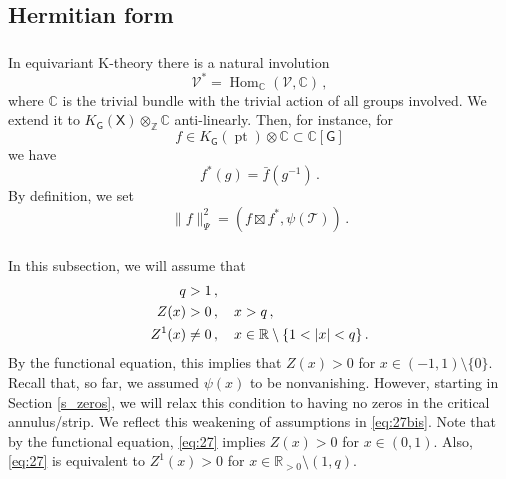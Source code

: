 \documentclass[14pt]{extarticle}
\newcommand{\C}{\mathbb{C}}
\newcommand{\Z}{\mathbb{Z}}
\newcommand{\R}{\mathbb{R}}
\newcommand{\bG}{\mathsf{G}}
\newcommand{\bX}{\mathsf{X}}
\newcommand{\cT}{\mathscr{T}}
\newcommand{\cV}{\mathscr{V}}
\DeclareMathOperator{\Hom}{Hom}
\DeclareMathOperator{\pt}{pt}
\theoremstyle{definition}
\begin{document}
\subsection{Hermitian form}

\subsubsection{}
 In equivariant K-theory there is a natural involution 
 \[
   \cV^* = \Hom_\C(\cV,\C)\,, 
 \]
 where $\C$ is the trivial bundle with the trivial action of all
 groups involved.
We extend it to $K_\bG(\bX) \otimes_\Z \C$ anti-linearly. 
Then, for instance, for
\[
  f \in K_\bG(\pt) \otimes \C \subset \C[\bG]
 \]
 we have
 \[
   f^*(g) = \bar{f}(g^{-1}) \,. 
 \]
 By definition, we set
 \begin{equation}
   \label{eq:20}
  \|f\|^2_\Psi = (f \boxtimes f^*, \psi(\cT)) \,. 
 \end{equation}

 \subsubsection{}


 
 In this subsection, we will assume that 
 \begin{align}
   q &>1 \,, \notag \\
   Z(x)&> 0\,, \quad x>q \,,  \label{eq:27} \\
   Z^1(x)&\ne 0\,,\quad  x \in \R \setminus \{1 < |x| < q\} \label{eq:27bis}
         \,. 
 \end{align}
 By the functional equation, this implies that $Z(x)>0$
 for $x \in (-1,1) \setminus \{0\}$. 
 Recall that, so far, we assumed $\psi(x)$ to be nonvanishing. However,
 starting in Section \ref{s_zeros}, we will relax this condition to
 having no zeros in the critical annulus/strip. We reflect this
 weakening of assumptions in \eqref{eq:27bis}. Note that by the functional
 equation, \eqref{eq:27} implies $Z(x)>0$ for $x\in (0,1)$. Also,
 \eqref{eq:27}
 is equivalent to 
 $Z^1(x)> 0$ for $x\in \R_{>0} \setminus (1,q)$. 

 
\end{document}
